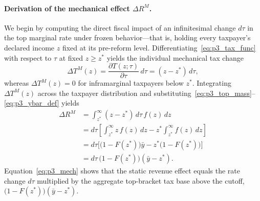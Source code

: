 \paragraph{Derivation of the mechanical effect $\Delta R^M$.}
We begin by computing the direct fiscal impact of an infinitesimal change $d\tau$ in the top marginal rate under frozen behavior—that is, holding every taxpayer's declared income $z$ fixed at its pre-reform level. Differentiating~\eqref{eq:p3_tax_func} with respect to $\tau$ at fixed $z \ge z^*$ yields the individual mechanical tax change
\begin{equation}
\Delta T^M(z) = \frac{\partial T(z; \tau)}{\partial \tau}\,d\tau = (z - z^*)\,d\tau,
\end{equation}
whereas $\Delta T^M(z) = 0$ for inframarginal taxpayers below $z^*$. Integrating $\Delta T^M(z)$ across the taxpayer distribution and substituting~\eqref{eq:p3_top_mass}--\eqref{eq:p3_ybar_def} yields
\begin{align}
\Delta R^M &= \int_{z^*}^\infty (z - z^*)\,d\tau\,f(z)\,dz \nonumber\\
&= d\tau \left[ \int_{z^*}^\infty z\,f(z)\,dz - z^* \int_{z^*}^\infty f(z)\,dz \right] \nonumber\\
&= d\tau \Big[ \big(1 - F(z^*)\big)\bar{y} - z^*\big(1 - F(z^*)\big) \Big] \nonumber\\
&= d\tau\,\big(1 - F(z^*)\big)(\bar{y} - z^*).
\label{eq:p3_mech}
\end{align}
Equation~\eqref{eq:p3_mech} shows that the static revenue effect equals the rate change $d\tau$ multiplied by the aggregate top-bracket tax base above the cutoff, $\big(1 - F(z^*)\big)(\bar{y} - z^*)$.

